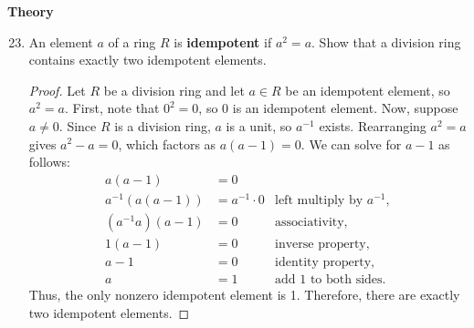 \documentclass[12pt, oneside]{book}
\newcommand{\pf}[1]{
    \begin{customframedproof}[linecolor=orangehdx!75]
        \begin{proof}
        #1
        \end{proof}
    \end{customframedproof}
}
\begin{document}
\textbf{Theory}

\begin{enumerate}
    \setcounter{enumi}{22}
    \item An element \(a\) of a ring \(R\) is \textbf{idempotent} if \(a^{2} = a\). Show that a division ring contains exactly two idempotent elements.
    \pf{
        Let $R$ be a division ring and let $a \in R$ be an idempotent element, so $a^2 = a$. First, note that $0^2 = 0$, so $0$ is an idempotent element. Now, suppose $a \neq 0$. Since $R$ is a division ring, $a$ is a unit, so $a^{-1}$ exists. 
        Rearranging $a^2 = a$ gives $a^2 - a = 0$, which factors as $a(a - 1) = 0$. 
        We can solve for $a - 1$ as follows:
        \begin{align*}
            a(a - 1) &= 0 \\
            a^{-1}(a(a - 1)) &= a^{-1} \cdot 0 & \text{left multiply by } a^{-1}, \\
            (a^{-1}a)(a - 1) &= 0 & \text{associativity,} \\
            1(a - 1) &= 0 & \text{inverse property,} \\
            a - 1 &= 0 & \text{identity property,} \\
            a &= 1 & \text{add 1 to both sides.}
        \end{align*}
        Thus, the only nonzero idempotent element is 1. Therefore, there are exactly two idempotent elements.
    }
\newpage


\end{enumerate}
\end{document}
